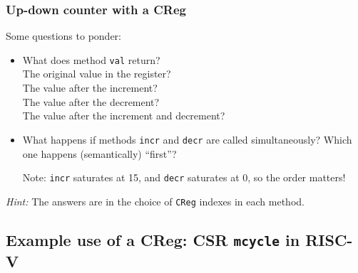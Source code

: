 \begin{frame}[fragile]
\frametitle{Up-down counter with a CReg}

\footnotesize

Some questions to ponder:

\begin{itemize}

  \item What does method {\tt val} return? \\
        \hm The original value in the register? \\
        \hm The value after the increment? \\
        \hm The value after the decrement? \\
        \hm The value after the increment and decrement?

  \item What happens if methods {\tt incr} and {\tt decr} are called
        simultaneously?  Which one happens (semantically) ``first''?

        Note: {\tt incr} saturates at 15, and {\tt decr} saturates at
        0, so the order matters!

\end{itemize}

\vspace{2ex}

\emph{Hint:} The answers are in the choice of {\tt CReg} indexes in each method.

\end{frame}


\subsection{Example use of a CReg: CSR {\tt mcycle} in RISC-V}

